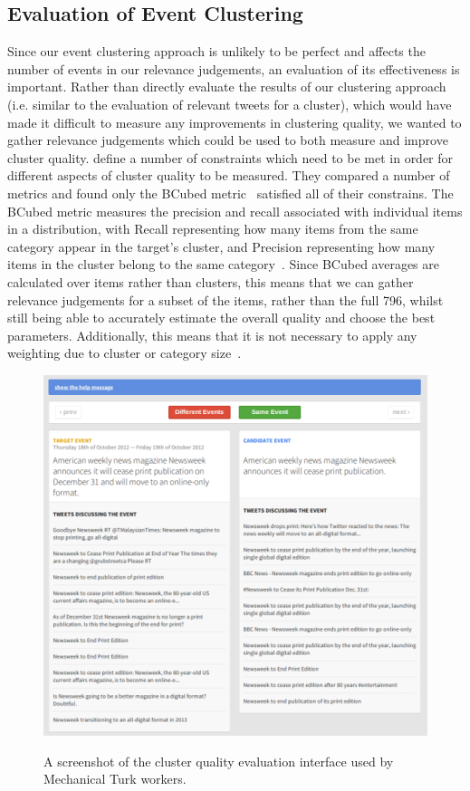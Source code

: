 
\subsection{Evaluation of Event Clustering}
\label{sec:clustering}
\label{collection:sec:eval}
Since our event clustering approach is unlikely to be perfect and affects the number of events in our relevance judgements, an evaluation of its effectiveness is important.
Rather than directly evaluate the results of our clustering approach (i.e. similar to the evaluation of relevant tweets for a cluster), which would have made it difficult to measure any improvements in clustering quality, we wanted to gather relevance judgements which could be used to both measure and improve cluster quality.
\cite{Amigo:2009:CEC:1555682.1555686} define a number of constraints which need to be met in order for different aspects of cluster quality to be measured.
They compared a number of metrics and found only the BCubed metric~\citep{Bagga:1998:ECC:980845.980859} satisfied all of their constrains.
The BCubed metric measures the precision and recall associated with individual items in a distribution, with Recall representing how many items from the same category appear in the target's cluster, and Precision representing how many items in the cluster belong to the same category~\citep{Amigo:2009:CEC:1555682.1555686}. Since BCubed averages are calculated over items rather than clusters, this means that we can gather relevance judgements for a subset of the items, rather than the full 796, whilst still being able to accurately estimate the overall quality and choose the best parameters. Additionally, this means that it is not necessary to apply any weighting due to cluster or category size~\citep{Amigo:2009:CEC:1555682.1555686}.

\begin{figure}[h]
	{\includegraphics[width=\textwidth]{./Chapters/Collection/images/cluster_eval}}
	\caption{A screenshot of the cluster quality evaluation interface used by Mechanical Turk workers.}
	\label{fig:one}
\end{figure}

